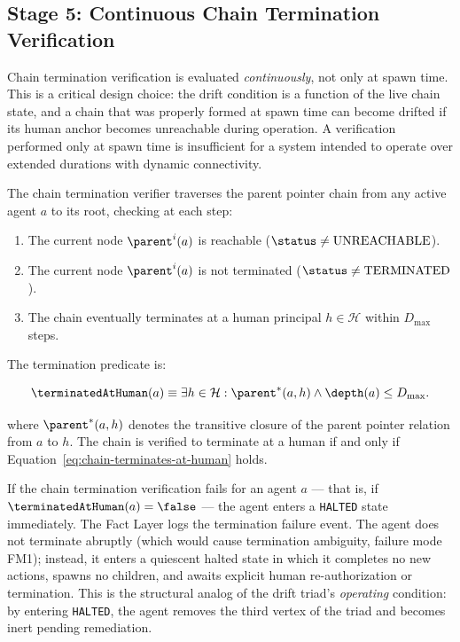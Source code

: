 \subsection{Stage 5: Continuous Chain Termination Verification}
\label{sec:rs-protocol-chain-termination}

Chain termination verification is evaluated \emph{continuously}, not only at spawn time. This is a critical design choice: the drift condition is a function of the live chain state, and a chain that was properly formed at spawn time can become drifted if its human anchor becomes unreachable during operation. A verification performed only at spawn time is insufficient for a system intended to operate over extended durations with dynamic connectivity.

The chain termination verifier traverses the parent pointer chain from any active agent $a$ to its root, checking at each step:

\begin{enumerate}
    \item The current node $\parent^i(a)$ is reachable ($\status \neq \text{UNREACHABLE}$).
    \item The current node $\parent^i(a)$ is not terminated ($\status \neq \text{TERMINATED}$).
    \item The chain eventually terminates at a human principal $h \in \mathcal{H}$ within $D_{\max}$ steps.
\end{enumerate}

The termination predicate is:

\begin{equation}
\terminatedAtHuman(a) \equiv \exists h \in \mathcal{H}: \parent^*(a, h) \land \depth(a) \leq D_{\max}.
\label{eq:chain-terminates-at-human}
\end{equation}

where $\parent^*(a, h)$ denotes the transitive closure of the parent pointer relation from $a$ to $h$. The chain is verified to terminate at a human if and only if Equation~\eqref{eq:chain-terminates-at-human} holds.

If the chain termination verification fails for an agent $a$ — that is, if $\terminatedAtHuman(a) = \false$ — the agent enters a \texttt{HALTED} state immediately. The Fact Layer logs the termination failure event. The agent does not terminate abruptly (which would cause termination ambiguity, failure mode FM1); instead, it enters a quiescent halted state in which it completes no new actions, spawns no children, and awaits explicit human re-authorization or termination. This is the structural analog of the drift triad's \emph{operating} condition: by entering \texttt{HALTED}, the agent removes the third vertex of the triad and becomes inert pending remediation.

